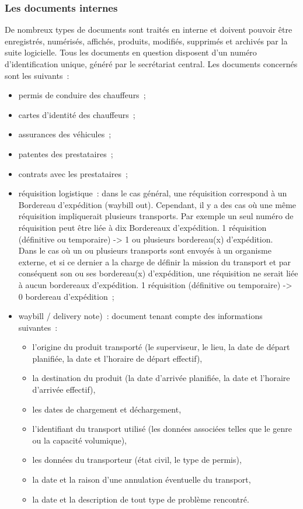 \subsubsection{Les documents internes}
De nombreux types de documents sont traités en interne et doivent pouvoir être enregistrés, numérisés, affichés, produits, modifiés, supprimés et archivés par la suite logicielle. Tous les documents en question disposent d'un numéro d'identification unique, généré par le secrétariat central. Les documents concernés sont les suivants~:
\begin{itemize}
\item permis de conduire des chauffeurs~;
\item cartes d'identité des chauffeurs~;
\item assurances des véhicules~;
\item patentes des prestataires~;
\item contrats avec les prestataires~;
\item réquisition logistique~: dans le cas général, une réquisition correspond à un Bordereau d'expédition (waybill out). Cependant, il y a des cas où une même réquisition impliquerait plusieurs transports. Par exemple un seul numéro de réquisition peut être liée à dix Bordereaux d'expédition. 1 réquisition (définitive ou temporaire) -> 1 ou plusieurs bordereau(x) d'expédition.
\\
Dans le cas où un ou plusieurs transports sont envoyés à un organisme externe, et si ce dernier a la charge de définir la mission du transport et par conséquent son ou ses bordereau(x) d'expédition, une réquisition ne serait liée à aucun bordereaux d'expédition. 1 réquisition (définitive ou temporaire) -> 0 bordereau d'expédition~;
\item waybill / delivery note)~: document tenant compte des informations suivantes~:
\begin{itemize}
\item l'origine du produit transporté (le superviseur, le lieu, la date de départ planifiée, la date et l'horaire de départ effectif),
\item la destination du produit (la date d'arrivée planifiée, la date et l'horaire d'arrivée effectif),
\item les dates de chargement et déchargement,
\item l'identifiant du transport utilisé (les données associées telles que le genre ou la capacité volumique),
\item les données du transporteur (état civil, le type de permis),
\item la date et la raison d'une annulation éventuelle du transport,
\item la date et la description de tout type de problème rencontré.
\end{itemize}
\end{itemize}

